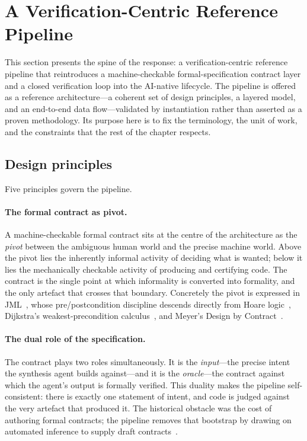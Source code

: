 \section{A Verification-Centric Reference Pipeline}\label{sec:a5-architecture}

This section presents the spine of the response: a verification-centric reference pipeline that reintroduces a machine-checkable formal-specification contract layer and a closed verification loop into the AI-native lifecycle. The pipeline is offered as a reference architecture---a coherent set of design principles, a layered model, and an end-to-end data flow---validated by instantiation rather than asserted as a proven methodology. Its purpose here is to fix the terminology, the unit of work, and the constraints that the rest of the chapter respects.

\subsection{Design principles}\label{subsec:a5-principles}

Five principles govern the pipeline.

\paragraph{The formal contract as pivot.} A machine-checkable formal contract sits at the centre of the architecture as the \emph{pivot} between the ambiguous human world and the precise machine world. Above the pivot lies the inherently informal activity of deciding what is wanted; below it lies the mechanically checkable activity of producing and certifying code. The contract is the single point at which informality is converted into formality, and the only artefact that crosses that boundary. Concretely the pivot is expressed in JML~\cite{leavens2006jml}, whose pre/postcondition discipline descends directly from Hoare logic~\cite{hoare1969axiomatic}, Dijkstra's weakest-precondition calculus~\cite{dijkstra1976discipline}, and Meyer's Design by Contract~\cite{meyer1992dbc}.

\paragraph{The dual role of the specification.} The contract plays two roles simultaneously. It is the \emph{input}---the precise intent the synthesis agent builds against---and it is the \emph{oracle}---the contract against which the agent's output is formally verified. This duality makes the pipeline self-consistent: there is exactly one statement of intent, and code is judged against the very artefact that produced it. The historical obstacle was the cost of authoring formal contracts; the pipeline removes that bootstrap by drawing on automated inference to supply draft contracts~\cite{edmonds_article1,edmonds_article3}.

